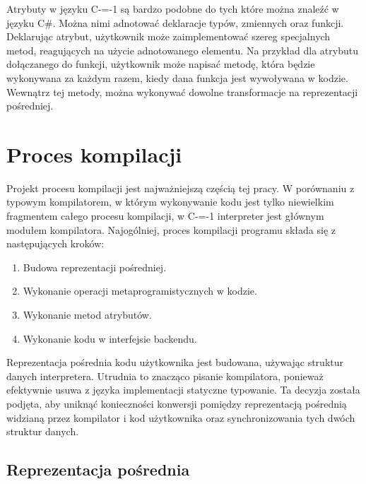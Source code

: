 \documentclass[conference]{IEEEtran}
\begin{document}
Atrybuty w języku C-=-1 są bardzo podobne do tych które można znaleźć w języku C\#.
Można nimi adnotować deklaracje typów, zmiennych oraz funkcji.
Deklarując atrybut, użytkownik może zaimplementować szereg specjalnych metod, reagujących na użycie adnotowanego elementu.
Na przykład dla atrybutu dołączanego do funkcji, użytkownik może napisać metodę, która będzie wykonywana za każdym razem, kiedy dana funkcja jest wywoływana w kodzie.
Wewnątrz tej metody, można wykonywać dowolne transformacje na reprezentacji pośredniej.

\section{Proces kompilacji}

Projekt procesu kompilacji jest najważniejszą częścią tej pracy.
W porównaniu z typowym kompilatorem, w którym wykonywanie kodu jest tylko niewielkim fragmentem całego procesu kompilacji, w C-=-1 interpreter jest głównym modułem kompilatora.
Najogólniej, proces kompilacji programu składa się z następujących kroków:
\begin{enumerate}
    \item Budowa reprezentacji pośredniej.
    \item Wykonanie operacji metaprogramistycznych w kodzie.
    \item Wykonanie metod atrybutów.
    \item Wykonanie kodu w interfejsie backendu.
\end{enumerate}

Reprezentacja pośrednia kodu użytkownika jest budowana, używając struktur danych interpretera.
Utrudnia to znacząco pisanie kompilatora, ponieważ efektywnie usuwa z języka implementacji statyczne typowanie.
Ta decyzja została podjęta, aby uniknąć konieczności konwersji pomiędzy reprezentacją pośrednią widzianą przez kompilator i kod użytkownika oraz synchronizowania tych dwóch struktur danych.

\subsection{Reprezentacja pośrednia}
\end{document}
